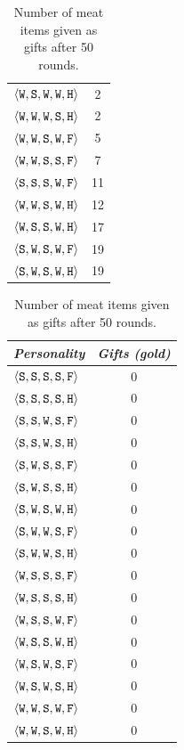 \begin{table}
{{\begin{minipage}[b]{0.30\hsize}
\begin{tabular}{ l | c }
					$\personality{W}{S}{W}{W}{H}$ & 2\\
					$\personality{W}{W}{W}{S}{H}$ & 2\\
					$\personality{W}{W}{S}{W}{F}$ & 5\\
					$\personality{W}{W}{S}{S}{F}$ & 7\\
					$\personality{S}{S}{S}{W}{F}$ & 11\\
					$\personality{W}{W}{S}{W}{H}$ & 12\\
					$\personality{W}{S}{S}{W}{H}$ & 17\\
					$\personality{S}{W}{S}{W}{F}$ & 19\\
					$\personality{S}{W}{S}{W}{H}$ & 19\\
					\hline
				\end{tabular}
				\caption{Number of meat items given as gifts after 50 rounds.}
				\label{tab:numMeatGiven}
			\end{minipage}
			\hfill
			\begin{minipage}[b]{0.30\hsize}\centering
				\begin{tabular}{ l | c }
					\emph{Personality} & \emph{Gifts (gold)} \\
					\hline
					$\personality{S}{S}{S}{S}{F}$ & 0\\
					$\personality{S}{S}{S}{S}{H}$ & 0\\
					$\personality{S}{S}{W}{S}{F}$ & 0\\
					$\personality{S}{S}{W}{S}{H}$ & 0\\
					$\personality{S}{W}{S}{S}{F}$ & 0\\
					$\personality{S}{W}{S}{S}{H}$ & 0\\
					$\personality{S}{W}{S}{W}{H}$ & 0\\
					$\personality{S}{W}{W}{S}{F}$ & 0\\
					$\personality{S}{W}{W}{S}{H}$ & 0\\
					$\personality{W}{S}{S}{S}{F}$ & 0\\
					$\personality{W}{S}{S}{S}{H}$ & 0\\
					$\personality{W}{S}{S}{W}{F}$ & 0\\
					$\personality{W}{S}{S}{W}{H}$ & 0\\
					$\personality{W}{S}{W}{S}{F}$ & 0\\
					$\personality{W}{S}{W}{S}{H}$ & 0\\
					$\personality{W}{W}{S}{W}{F}$ & 0\\
					$\personality{W}{W}{S}{W}{H}$ & 0\\

\end{tabular}
\end{minipage}}}
\end{table}
